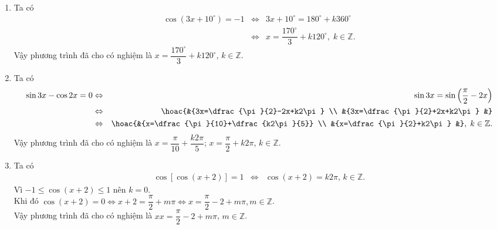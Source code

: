 \begin{ex}
{\begin{enumerate}
			\item  Ta có
			\begin{eqnarray*}
				 \cos \left(3x+10^\circ \right)=-1&\Leftrightarrow& 3x+10^\circ=180^\circ+k360^\circ\\
				&\Leftrightarrow& x=\dfrac{170^\circ}{3}+k120^\circ,\; k\in  \mathbb{Z}.
			\end{eqnarray*}
			Vậy phương trình đã cho có nghiệm là $x=\dfrac{170^\circ}{3}+k120^\circ$, $k\in  \mathbb{Z}$.
			\item Ta  có
			\begin{eqnarray*}
				\sin 3x-\cos 2x=0&\Leftrightarrow& \sin  3x=\sin \left(\dfrac{\pi}{2}-2x\right)\\
				&\Leftrightarrow&  \hoac{&{3x=\dfrac{\pi}{2}-2x+k2\pi} \\
				 &{3x=\dfrac{\pi}{2}+2x+k2\pi}
				 &} \\
				&\Leftrightarrow& \hoac{&{x=\dfrac{\pi}{10}+\dfrac{k2\pi}{5}}  \\
				 &{x=\dfrac{\pi}{2}+k2\pi}
				&},\; k\in \mathbb{Z}. 
			\end{eqnarray*}
			Vậy phương trình đã cho có nghiệm là $x=\dfrac{\pi}{10}+\dfrac{k2\pi}{5}$;  $x=\dfrac{\pi}{2}+k2\pi$, $k\in \mathbb{Z}$.
			\item Ta  có
			\begin{eqnarray*}
				\cos \left[\cos \left(x+2\right)\right]=1&\Leftrightarrow& \cos \left(x+2\right)=k2\pi,\,k\in \mathbb{Z}. 
			\end{eqnarray*}
			Vì $-1\le \cos \left(x+2\right)\le 1$  nên $k=0$.\\
			Khi  đó $\cos \left(x+2\right)=0\Leftrightarrow x+2=\dfrac{\pi}{2}+m\pi \Leftrightarrow x=\dfrac{\pi}{2}-2+m\pi, m\in \mathbb{Z}$.\\
			Vậy phương trình đã cho có  nghiệm là $xx=\dfrac{\pi}{2}-2+m\pi$, $m\in \mathbb{Z}$.
		\end{enumerate}
	 }
\end{ex}

